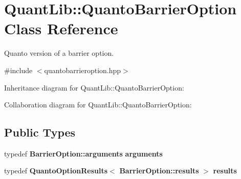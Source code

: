 \section{Quant\+Lib\+:\+:Quanto\+Barrier\+Option Class Reference}
\label{class_quant_lib_1_1_quanto_barrier_option}


Quanto version of a barrier option.  




{\ttfamily \#include $<$quantobarrieroption.\+hpp$>$}



Inheritance diagram for Quant\+Lib\+:\+:Quanto\+Barrier\+Option\+:


Collaboration diagram for Quant\+Lib\+:\+:Quanto\+Barrier\+Option\+:
\subsection*{Public Types}
\begin{DoxyCompactItemize}
\item 
typedef {\bf Barrier\+Option\+::arguments} {\bfseries arguments}\label{class_quant_lib_1_1_quanto_barrier_option_abdbcffc39808c2e502f41a7b643ada2e}

\item 
typedef {\bf Quanto\+Option\+Results}$<$ {\bf Barrier\+Option\+::results} $>$ {\bfseries results}\label{class_quant_lib_1_1_quanto_barrier_option_a8d9e84fb218ddd10f0760b3bbd56c4d4}

\end{DoxyCompactItemize}

